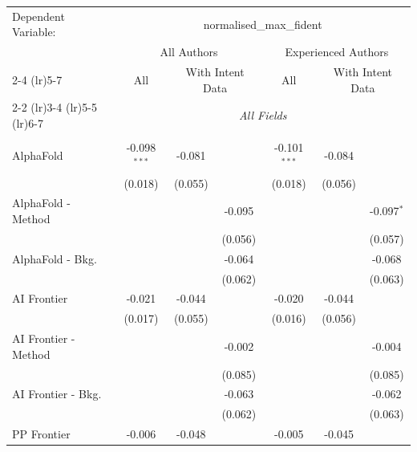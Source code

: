 \begingroup
\centering
\begin{tabular}{lcccccc}
   \tabularnewline \midrule \midrule
   Dependent Variable: & \multicolumn{6}{c}{normalised\_max\_fident}\\
 & \multicolumn{3}{c}{All Authors} & \multicolumn{3}{c}{Experienced Authors} \\
\cmidrule(lr){2-4} \cmidrule(lr){5-7}
 & \multicolumn{1}{c}{All} & \multicolumn{2}{c}{With Intent Data} & \multicolumn{1}{c}{All} & \multicolumn{2}{c}{With Intent Data} \\
\cmidrule(lr){2-2} \cmidrule(lr){3-4} \cmidrule(lr){5-5} \cmidrule(lr){6-7}
 & \multicolumn{6}{c}{\textit{All Fields}} \\ \\
   AlphaFold            & -0.098$^{***}$ & -0.081  &         & -0.101$^{***}$ & -0.084  &   \\   
                        & (0.018)        & (0.055) &         & (0.018)        & (0.056) &   \\   
   AlphaFold - Method   &                &         & -0.095  &                &         & -0.097$^{*}$\\   
                        &                &         & (0.056) &                &         & (0.057)\\   
   AlphaFold - Bkg.     &                &         & -0.064  &                &         & -0.068\\   
                        &                &         & (0.062) &                &         & (0.063)\\   
   AI Frontier          & -0.021         & -0.044  &         & -0.020         & -0.044  &   \\   
                        & (0.017)        & (0.055) &         & (0.016)        & (0.056) &   \\   
   AI Frontier - Method &                &         & -0.002  &                &         & -0.004\\   
                        &                &         & (0.085) &                &         & (0.085)\\   
   AI Frontier - Bkg.   &                &         & -0.063  &                &         & -0.062\\   
                        &                &         & (0.062) &                &         & (0.063)\\   
   PP Frontier          & -0.006         & -0.048  &         & -0.005         & -0.045  &   \\   

\end{tabular}

